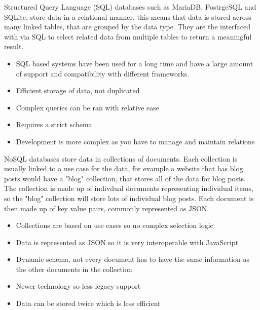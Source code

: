   Structured Query Language (SQL) databases such as MariaDB, PostrgeSQL and SQLite, store data in a relational manner, this means that data is stored across many linked tables, that are grouped by the data type. They are the interfaced with via SQL to select related data from multiple tables to return a meaningful result. 
  
  \begin{itemize}
    \item SQL based systems have been used for a long time and have a large amount of support and compatibility with different frameworks. 
    \item Efficient storage of data, not duplicated
    \item Complex queries can be ran with relative ease
    \item Requires a strict schema 
    \item Development is more complex as you have to manage and maintain relations
  \end{itemize}

  NoSQL databases store data in collections of documents. Each collection is usually linked to a use case for the data, for example a website that has blog posts would have a "blog" collection, that stores all of the data for blog posts. The collection is made up of indivdual documents representing individual items, so the "blog" collection will store lots of individual blog posts. Each document is then made up of key value pairs, commonly represented as JSON. 

  \begin{itemize}
    \item Collections are based on use cases so no complex selection logic
    \item Data is represented as JSON so it is very interoperable with JavaScript
    \item Dynamic schema, not every document has to have the same information as the other documents in the collection
    \item Newer technology so less legacy support
    \item Data can be stored twice which is less efficient
  \end{itemize}



